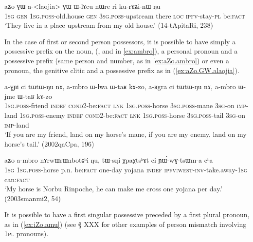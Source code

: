 \begin{exe}
\ex \label{ex:aZo.GW.alaojia}
\gll
aʑo ɣɯ a-<laojia> ɣɯ ɯ-lɤcu nɯre ri ku-rɤʑi-nɯ ŋu \\
\textsc{1sg} \textsc{gen} \textsc{1sg.poss}-old.house \textsc{gen} \textsc{3sg.poss}-upstream there \textsc{loc} \textsc{ipfv}-stay-\textsc{pl} be:\textsc{fact} \\
\glt `They live in a place upstream from my old house.' (14-tApitaRi, 238)
\end{exe}

In the case of first or second person possessors, it is possible to have simply a possessive prefix on the noun, (,  and  in \ref{ex:ambro}), a personal pronoun and a possessive prefix (same person and number, as in \ref{ex:aZo.ambro}) or even a pronoun, the genitive clitic  and a possessive prefix as in (\ref{ex:aZo.GW.alaojia}).

 \begin{exe}
\ex \label{ex:ambro} 
\gll a-ɣɲi ci tɯ\redp{}tɯ-ŋu nɤ, a-mbro ɯ-lwa ɯ-taʁ kɤ-zo, a-ʁgra ci tɯ\redp{}tɯ-ŋu nɤ, a-mbro ɯ-jme ɯ-taʁ kɤ-zo \\
\textsc{1sg.poss}-friend \textsc{indef} \textsc{cond}\redp{}2-be:\textsc{fact} \textsc{lnk} \textsc{1sg.poss}-horse \textsc{3sg.poss}-mane \textsc{3sg}-on \textsc{imp}-land \textsc{1sg.poss}-enemy \textsc{indef} \textsc{cond}\redp{}2-be:\textsc{fact} \textsc{lnk} \textsc{1sg.poss}-horse \textsc{3sg.poss}-tail  \textsc{3sg}-on \textsc{imp}-land  \\
\glt `If you are my friend, land on my horse's mane, if you are my enemy, land on my horse's tail.' (2002qaCpa, 196)
\end{exe}

\begin{exe}
\ex \label{ex:aZo.ambro}
\gll aʑo a-mbro nɤrwɯrɯnbotɕʰi ŋu, tɯ-sŋi χpaχtsʰɤt ci ɲɯ́-wɣ-tsɯm-a cʰa \\
\textsc{1sg} \textsc{1sg.poss}-horse p.n. be:\textsc{fact} one-day yojana \textsc{indef} \textsc{ipfv:west}-\textsc{inv}-take.away-\textsc{1sg} can:\textsc{fact} \\
\glt `My horse is Norbu Rinpoche, he can make me cross one yojana per day.' (2003smanmi2, 54)
\end{exe}

It is possible to have a first singular possessive preceded by a first plural pronoun, as in (\ref{ex:iZo.amu}) (see § XXX for other examples of person mismatch involving \textsc{1pl} pronouns).

